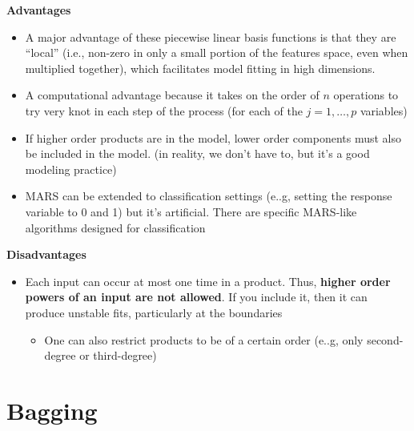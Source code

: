 \documentclass[
]{book}
\providecommand{\tightlist}{%
  \setlength{\itemsep}{0pt}\setlength{\parskip}{0pt}}
\begin{document}
\textbf{Advantages}

\begin{itemize}
\item
  A major advantage of these piecewise linear basis functions is that they are ``local'' (i.e., non-zero in only a small portion of the features space, even when multiplied together), which facilitates model fitting in high dimensions.
\item
  A computational advantage because it takes on the order of \(n\) operations to try very knot in each step of the process (for each of the \(j = 1, \dots, p\) variables)
\item
  If higher order products are in the model, lower order components must also be included in the model. (in reality, we don't have to, but it's a good modeling practice)
\item
  MARS can be extended to classification settings (e..g, setting the response variable to 0 and 1) but it's artificial. There are specific MARS-like algorithms designed for classification
\end{itemize}

\textbf{Disadvantages}

\begin{itemize}
\item
  Each input can occur at most one time in a product. Thus, \textbf{higher order powers of an input are not allowed}. If you include it, then it can produce unstable fits, particularly at the boundaries

  \begin{itemize}
  \tightlist
  \item
    One can also restrict products to be of a certain order (e..g, only second-degree or third-degree)
  \end{itemize}
\end{itemize}

\hypertarget{bagging}{%
\chapter{Bagging}\label{bagging}}
\end{document}
